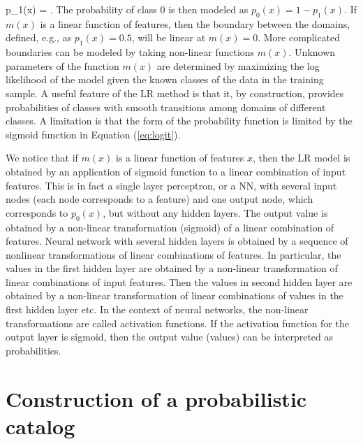 \be
{}
p_1(x) = .
\ee
The probability of class 0 is then modeled as $p_0(x) = 1 - p_1(x)$.
If $m(x)$ is a linear function of features, then the boundary between the domains, defined, e.g., as $p_1(x) = 0.5$, will be linear
at $m(x) = 0$.
More complicated boundaries can be modeled by taking non-linear functions $m(x)$.
Unknown parameters of the function $m(x)$ are determined by maximizing the log likelihood of the model given the known classes of the data in the training sample.
A useful feature of the LR method is that it, by construction, provides probabilities of classes with smooth transitions among domains of different classes.
A limitation is that the form of the probability function is limited by the sigmoid function in Equation (\ref{eq:logit}).

We notice that if $m(x)$ is a linear function of features $x$, then the LR model is obtained by an application of sigmoid function to a linear combination of input features.
This is in fact a single layer perceptron, or a NN, with several input nodes (each node corresponds to a feature) and one output node, which corresponds to $p_0(x)$, but without any hidden layers.
The output value is obtained by a non-linear transformation (sigmoid) of a linear combination of features.
Neural network with several hidden layers is obtained by a sequence of nonlinear transformations of linear combinations of features.
In particular, the values in the first hidden layer are obtained by a non-linear transformation of linear combinations of input features.
Then the values in second hidden layer are obtained by a non-linear transformation of  linear combinations of values in the first hidden layer etc.
In the context of neural networks, the non-linear transformations are called activation functions.
If the activation function for the output layer is sigmoid, then the output value (values) can be interpreted as probabilities.

\section{Construction of a probabilistic catalog}

